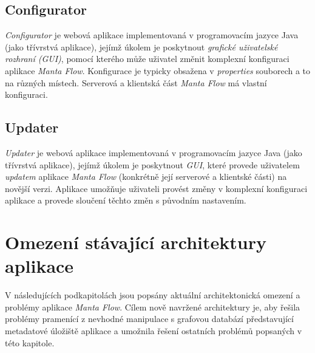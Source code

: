 \subsection{Configurator}
\label{sec:ana_configurator}
\textit{Configurator} je webová aplikace implementovaná v programovacím jazyce Java (jako třívrstvá aplikace), jejímž úkolem je poskytnout \textit{grafické uživatelské rozhraní (GUI)}, pomocí kterého může uživatel změnit komplexní konfiguraci aplikace \textit{Manta Flow}. Konfigurace je typicky obsažena v \textit{properties} souborech a to na různých místech. Serverová a klientská část \textit{Manta Flow} má vlastní konfiguraci. \cite{Molitor18}

\subsection{Updater}
\label{sec:ana_updater}
\textit{Updater} je webová aplikace implementovaná v programovacím jazyce Java (jako třívrstvá aplikace), jejímž úkolem je poskytnout \textit{GUI}, které provede uživatelem \textit{updatem} aplikace \textit{Manta Flow} (konkrétně její serverové a klientské části) na novější verzi. Aplikace umožňuje uživateli provést změny v komplexní konfiguraci aplikace a provede sloučení těchto změn s původním nastavením. \cite{Gondek16}

\section{Omezení stávající architektury aplikace}
\label{sec:ana_problems}
V následujících podkapitolách jsou popsány aktuální architektonická omezení a problémy aplikace \textit{Manta Flow}. Cílem nově navržené architektury je, aby řešila problémy pramenící z nevhodné manipulace s grafovou databází představující metadatové úložiště aplikace a umožnila řešení ostatních problémů popsaných v této kapitole.


